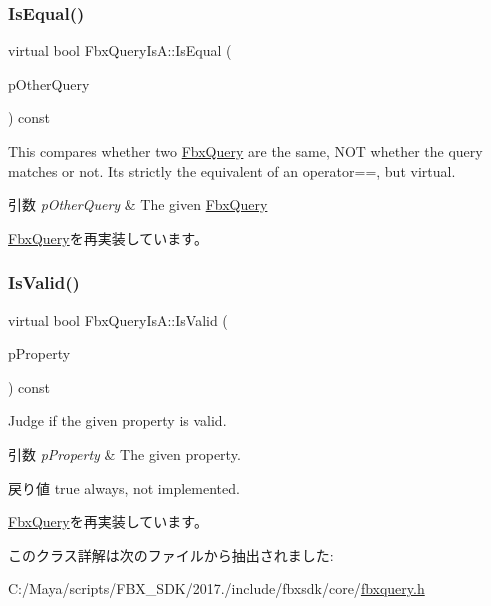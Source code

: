 \subsubsection{\texorpdfstring{Is\+Equal()}{IsEqual()}}
{\footnotesize\ttfamily virtual bool Fbx\+Query\+Is\+A\+::\+Is\+Equal (\begin{DoxyParamCaption}\item[{\hyperlink{class_fbx_query}{Fbx\+Query} $\ast$}]{p\+Other\+Query }\end{DoxyParamCaption}) const\hspace{0.3cm}{\ttfamily [virtual]}}

This compares whether two \hyperlink{class_fbx_query}{Fbx\+Query} are the same, N\+OT whether the query matches or not. It\textquotesingle{}s strictly the equivalent of an operator==, but virtual. 
\begin{DoxyParams}{引数}
{\em p\+Other\+Query} & The given \hyperlink{class_fbx_query}{Fbx\+Query} \\
\hline
\end{DoxyParams}


\hyperlink{class_fbx_query_adfc24c7306ceed2fcfd8c67198e0c1dd}{Fbx\+Query}を再実装しています。

\mbox{\label{class_fbx_query_is_a_a6d3da2f05ab6e50346af8e9713168772}} 
\subsubsection{\texorpdfstring{Is\+Valid()}{IsValid()}}
{\footnotesize\ttfamily virtual bool Fbx\+Query\+Is\+A\+::\+Is\+Valid (\begin{DoxyParamCaption}\item[{const \hyperlink{class_fbx_property}{Fbx\+Property} \&}]{p\+Property }\end{DoxyParamCaption}) const\hspace{0.3cm}{\ttfamily [virtual]}}

Judge if the given property is valid. 
\begin{DoxyParams}{引数}
{\em p\+Property} & The given property. \\
\hline
\end{DoxyParams}
\begin{DoxyReturn}{戻り値}
{\ttfamily true} always, not implemented. 
\end{DoxyReturn}


\hyperlink{class_fbx_query_a822776baf45a56d8e126e948ec25d920}{Fbx\+Query}を再実装しています。



このクラス詳解は次のファイルから抽出されました\+:\begin{DoxyCompactItemize}
\item 
C\+:/\+Maya/scripts/\+F\+B\+X\+\_\+\+S\+D\+K/2017./include/fbxsdk/core/\hyperlink{fbxquery_8h}{fbxquery.\+h}\end{DoxyCompactItemize}
